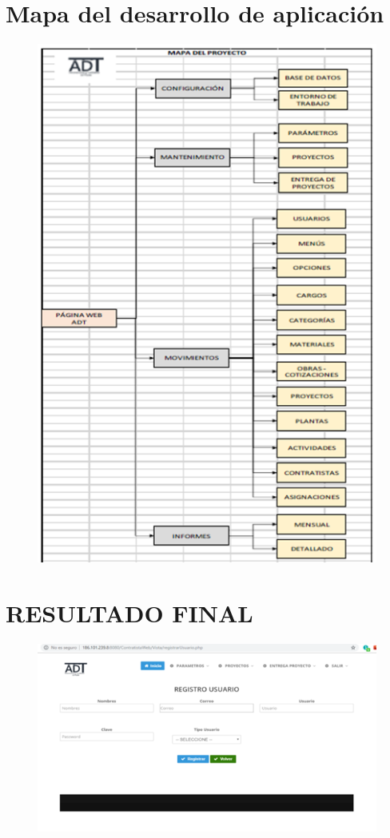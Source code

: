 \documentclass[12pt,a4paper]{article}
\begin{document}
\section*{Mapa del desarrollo de aplicación}
\begin{figure}[hbtp]
\caption{}
\centering
\includegraphics[scale=0.5]{DECIMOTERCERA.png}
\end{figure}


\section*{RESULTADO FINAL}
\begin{figure}[hbtp]
\caption{}
\centering
\includegraphics[scale=0.5]{DECIMOCUARTA.png}
\end{figure}
\end{document}
